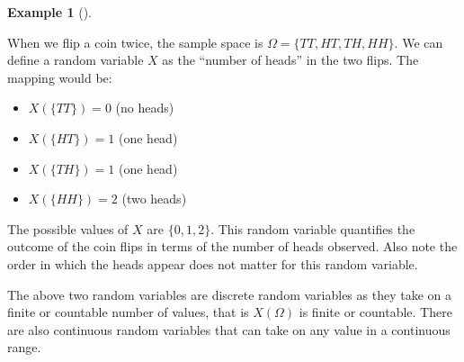 \documentclass[
  letterpaper,
  DIV=11,
  numbers=noendperiod]{scrreport}
\providecommand{\tightlist}{%
  \setlength{\itemsep}{0pt}\setlength{\parskip}{0pt}}
\theoremstyle{definition}
\newtheorem{example}{Example}[chapter]
\theoremstyle{plain}
\theoremstyle{definition}
\theoremstyle{plain}
\theoremstyle{remark}
\begin{document}
\begin{tcolorbox}[enhanced jigsaw, breakable, opacityback=0, leftrule=.75mm, colback=white, bottomtitle=1mm, coltitle=black, toptitle=1mm, titlerule=0mm, bottomrule=.15mm, colframe=quarto-callout-note-color-frame, title={Random variable: Number of heads in two coin flips}, opacitybacktitle=0.6, colbacktitle=quarto-callout-note-color!10!white, rightrule=.15mm, arc=.35mm, toprule=.15mm, left=2mm]

\begin{example}[]\protect\hypertarget{exm-random-variable-heads}{}\label{exm-random-variable-heads}

When we flip a coin twice, the sample space is
\(\Omega = \{TT, HT, TH, HH\}\). We can define a random variable \(X\)
as the ``number of heads'' in the two flips. The mapping would be:

\begin{itemize}
\tightlist
\item
  \(X(\{TT\}) = 0\) (no heads)
\item
  \(X(\{HT\}) = 1\) (one head)
\item
  \(X(\{TH\}) = 1\) (one head)
\item
  \(X(\{HH\}) = 2\) (two heads)
\end{itemize}

The possible values of \(X\) are \(\{0, 1, 2\}\). This random variable
quantifies the outcome of the coin flips in terms of the number of heads
observed. Also note the order in which the heads appear does not matter
for this random variable.

\end{example}

\end{tcolorbox}

The above two random variables are discrete random variables as they
take on a finite or countable number of values, that is \(X(\Omega)\) is
finite or countable. There are also continuous random variables that can
take on any value in a continuous range.
\end{document}
